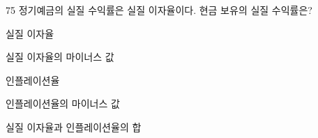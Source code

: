 \begin{question}{75}
정기예금의 실질 수익률은 실질 이자율이다. 현금 보유의 실질 수익률은?
\begin{choices}
  \item 실질 이자율
  \item 실질 이자율의 마이너스 값
  \item 인플레이션율
  \item 인플레이션율의 마이너스 값
  \item 실질 이자율과 인플레이션율의 합
\end{choices}
\end{question}

